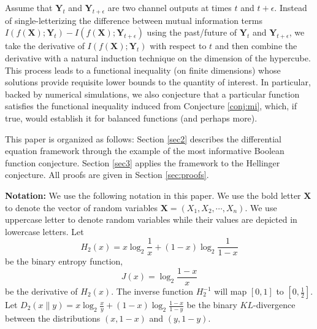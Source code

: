 \documentclass[conference,letterpaper,onecolumn]{IEEEtran}
\theoremstyle{plain}%
\newcommand{\bY}{\mathbf{Y}}
\newcommand{\bX}{\mathbf{X}}
\begin{document}
Assume that $\bY_t$ and $\bY_{t+\epsilon}$ are two channel outputs at times $t$ and $t+\epsilon$. Instead of single-letterizing the difference between mutual information terms
$I(f(\bX);\bY_t)-I(f(\bX);\bY_{t+\epsilon})$
using the past/future of $\bY_t$ and $\bY_{t+\epsilon}$, we take the derivative of $I(f(\bX);\bY_t)$ with respect to $t$ and then combine the derivative with a natural induction technique on the dimension of the hypercube. This process leads to a functional inequality (on finite dimensions) whose solutions provide requisite lower bounds to the quantity of interest. In particular, backed by numerical simulations, we also conjecture that a particular function satisfies the functional inequality induced from Conjecture \ref{conj:mi}, which, if true, would establish it for balanced functions (and perhaps more).


This paper is organized as follows: Section \ref{sec2} describes the differential equation framework through the example of the most informative Boolean function conjecture. Section \ref{sec3} applies the framework to the Hellinger conjecture. All proofs are given in Section \ref{sec:proofs}.

\textbf{Notation:} We use the following notation in this paper. We use the bold letter $\bX$ to denote the vector of random variables $\bX=(X_1, X_2, \cdots, X_n)$. We use uppercase letter to denote random variables while their values are depicted in lowercase letters. Let $$H_2(x)=x\log_2\frac{1}{x}+(1-x)\log_2\frac{1}{1-x}$$ be the binary entropy function, $$J(x) = \log_2 \frac{1 - x}{x}$$ be the derivative of $H_2(x)$. The inverse function $H_2^{-1}$ will map $[0,1]$ to $[0,\frac12]$. Let $D_2(x\|y)=x\log_2\frac{x}{y}+(1-x)\log_2\frac{1-x}{1-y}$ be the binary $KL$-divergence between the distributions $(x,1-x)$ and $(y,1-y)$.
\end{document}
